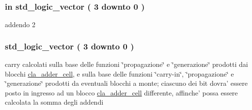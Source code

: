 \hypertarget{group___nibble_adder_gad1fa6d9d78208885ad2f4c417fc4b530}{
\subsubsection[{addendum2}]{ {\bfseries \textcolor{vhdlchar}{in}\textcolor{vhdlchar}{ }} {\bfseries \textcolor{vhdlchar}{std\+\_\+logic\+\_\+vector}\textcolor{vhdlchar}{ }\textcolor{vhdlchar}{(}\textcolor{vhdlchar}{ }\textcolor{vhdlchar}{ } \textcolor{vhdldigit}{3} \textcolor{vhdlchar}{ }\textcolor{vhdlchar}{downto}\textcolor{vhdlchar}{ }\textcolor{vhdlchar}{ } \textcolor{vhdldigit}{0} \textcolor{vhdlchar}{ }\textcolor{vhdlchar}{)}\textcolor{vhdlchar}{ }} \hspace{0.3cm}{\ttfamily [Port]}}}\label{group___nibble_adder_gad1fa6d9d78208885ad2f4c417fc4b530}


addendo 2 

\hypertarget{group___nibble_adder_ga8f5524d80e551d479327a16bb32abcaa}{
\subsubsection[{carry}]{ {\bfseries \textcolor{vhdlchar}{std\+\_\+logic\+\_\+vector}\textcolor{vhdlchar}{ }\textcolor{vhdlchar}{(}\textcolor{vhdlchar}{ }\textcolor{vhdlchar}{ } \textcolor{vhdldigit}{3} \textcolor{vhdlchar}{ }\textcolor{vhdlchar}{downto}\textcolor{vhdlchar}{ }\textcolor{vhdlchar}{ } \textcolor{vhdldigit}{0} \textcolor{vhdlchar}{ }\textcolor{vhdlchar}{)}\textcolor{vhdlchar}{ }} \hspace{0.3cm}{\ttfamily [Signal]}}}\label{group___nibble_adder_ga8f5524d80e551d479327a16bb32abcaa}


carry calcolati sulla base delle funzioni \char`\"{}propagazione\char`\"{} e \char`\"{}generazione\char`\"{} prodotti dai blocchi \hyperlink{classcla__adder__cell}{cla\+\_\+adder\+\_\+cell}, e sulla base delle funzioni \char`\"{}carry-\/in\char`\"{}, \char`\"{}propagazione\char`\"{} e \char`\"{}generazione\char`\"{} prodotti da eventuali blocchi a monte; ciascuno dei bit dovra' essere posto in ingresso ad un blocco \hyperlink{classcla__adder__cell}{cla\+\_\+adder\+\_\+cell} differente, affinche' possa essere calcolata la somma degli addendi 

